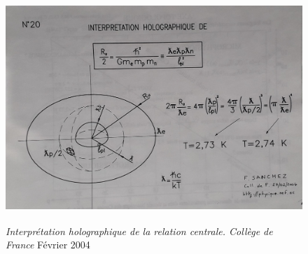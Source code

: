 \documentclass[a4paper,12pt]{article}
\begin{document}
\begin{appendix}
\begin{figure}
\centering
\includegraphics[width=14.5cm,height=8.6cm]{./figures/Holotemperature.jpg}
\caption[Interprétation holographique de la relation centrale. Collège de France]{\textit{Interprétation holographique de la relation centrale. Collège de France} Février 2004}
\label{fig:20:figure20}
\end{figure}




\end{appendix}
\end{document}
